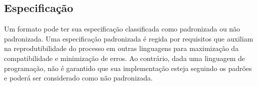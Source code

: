 \subsection[Especificação]{Especificação}

Um formato pode ter sua especificação classificada como padronizada ou não padronizada. Uma especificação padronizada é regida por requisitos que auxiliam na reprodutibilidade do processo em outras linguagens para maximização da compatibilidade e minimização de erros. Ao contrário, dada uma linguagem de programação, não é garantido que sua implementação esteja seguindo os padrões e poderá ser considerado como não padronizada. \cite{McDermid1991}
